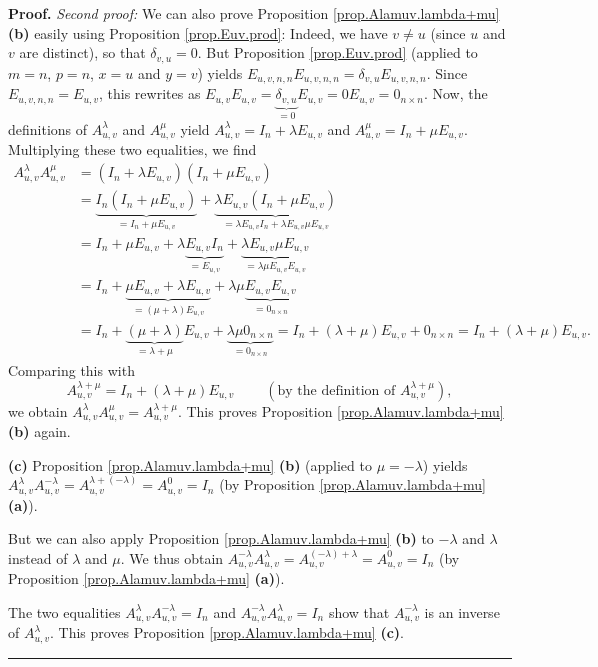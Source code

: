 \documentclass[numbers=enddot,12pt,final,onecolumn,notitlepage]{scrartcl}%
\theoremstyle{definition}
\newenvironment{proof}[1][Proof]{\noindent\textbf{#1.} }{\ \rule{0.5em}{0.5em}}
\begin{document}
\begin{proof}
\textit{Second proof:} We can also prove Proposition
\ref{prop.Alamuv.lambda+mu} \textbf{(b)} easily using Proposition
\ref{prop.Euv.prod}: Indeed, we have $v\neq u$ (since $u$ and $v$ are
distinct), so that $\delta_{v,u}=0$. But Proposition \ref{prop.Euv.prod}
(applied to $m=n$, $p=n$, $x=u$ and $y=v$) yields $E_{u,v,n,n}E_{u,v,n,n}%
=\delta_{v,u}E_{u,v,n,n}$. Since $E_{u,v,n,n}=E_{u,v}$, this rewrites as
$E_{u,v}E_{u,v}=\underbrace{\delta_{v,u}}_{=0}E_{u,v}=0E_{u,v}=0_{n\times n}$.
Now, the definitions of $A_{u,v}^{\lambda}$ and $A_{u,v}^{\mu}$ yield
$A_{u,v}^{\lambda}=I_{n}+\lambda E_{u,v}$ and $A_{u,v}^{\mu}=I_{n}+\mu
E_{u,v}$. Multiplying these two equalities, we find%
\begin{align*}
A_{u,v}^{\lambda}A_{u,v}^{\mu}  &  =\left(  I_{n}+\lambda E_{u,v}\right)
\left(  I_{n}+\mu E_{u,v}\right) \\
&  =\underbrace{I_{n}\left(  I_{n}+\mu E_{u,v}\right)  }_{=I_{n}+\mu E_{u,v}%
}+\underbrace{\lambda E_{u,v}\left(  I_{n}+\mu E_{u,v}\right)  }_{=\lambda
E_{u,v}I_{n}+\lambda E_{u,v}\mu E_{u,v}}\\
&  =I_{n}+\mu E_{u,v}+\lambda\underbrace{E_{u,v}I_{n}}_{=E_{u,v}%
}+\underbrace{\lambda E_{u,v}\mu E_{u,v}}_{=\lambda\mu E_{u,v}E_{u,v}}\\
&  =I_{n}+\underbrace{\mu E_{u,v}+\lambda E_{u,v}}_{=\left(  \mu
+\lambda\right)  E_{u,v}}+\lambda\mu\underbrace{E_{u,v}E_{u,v}}_{=0_{n\times
n}}\\
&  =I_{n}+\underbrace{\left(  \mu+\lambda\right)  }_{=\lambda+\mu}%
E_{u,v}+\underbrace{\lambda\mu0_{n\times n}}_{=0_{n\times n}}=I_{n}+\left(
\lambda+\mu\right)  E_{u,v}+0_{n\times n}=I_{n}+\left(  \lambda+\mu\right)
E_{u,v}.
\end{align*}
Comparing this with
\[
A_{u,v}^{\lambda+\mu}=I_{n}+\left(  \lambda+\mu\right)  E_{u,v}%
\ \ \ \ \ \ \ \ \ \ \left(  \text{by the definition of }A_{u,v}^{\lambda+\mu
}\right)  ,
\]
we obtain $A_{u,v}^{\lambda}A_{u,v}^{\mu}=A_{u,v}^{\lambda+\mu}$. This proves
Proposition \ref{prop.Alamuv.lambda+mu} \textbf{(b)} again.

\textbf{(c)} Proposition \ref{prop.Alamuv.lambda+mu} \textbf{(b)} (applied to
$\mu=-\lambda$) yields $A_{u,v}^{\lambda}A_{u,v}^{-\lambda}=A_{u,v}%
^{\lambda+\left(  -\lambda\right)  }=A_{u,v}^{0}=I_{n}$ (by Proposition
\ref{prop.Alamuv.lambda+mu} \textbf{(a)}).

But we can also apply Proposition \ref{prop.Alamuv.lambda+mu} \textbf{(b)} to
$-\lambda$ and $\lambda$ instead of $\lambda$ and $\mu$. We thus obtain
$A_{u,v}^{-\lambda}A_{u,v}^{\lambda}=A_{u,v}^{\left(  -\lambda\right)
+\lambda}=A_{u,v}^{0}=I_{n}$ (by Proposition \ref{prop.Alamuv.lambda+mu}
\textbf{(a)}).

The two equalities $A_{u,v}^{\lambda}A_{u,v}^{-\lambda}=I_{n}$ and
$A_{u,v}^{-\lambda}A_{u,v}^{\lambda}=I_{n}$ show that $A_{u,v}^{-\lambda}$ is
an inverse of $A_{u,v}^{\lambda}$. This proves Proposition
\ref{prop.Alamuv.lambda+mu} \textbf{(c)}.
\end{proof}
\end{document}
